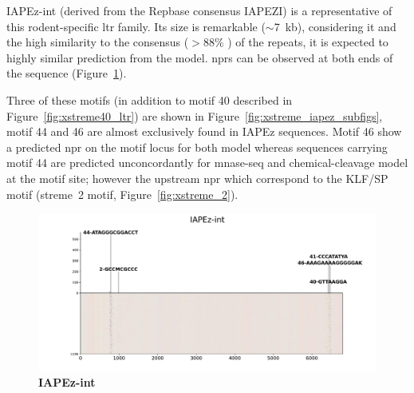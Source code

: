 \documentclass[11pt]{book}
\begin{document}
IAPEz-int (derived from the Repbase consensus IAPEZI) \cite{Repbase_IAPEZI} is a representative of this rodent-specific \gls{ltr} family. Its size is remarkable ($\sim$7~kb), considering it and the high similarity to the consensus ($>$88\% \cite{Repbase_IAPEZI}) of the repeats, it is expected to highly similar prediction from the model. \Glspl{npr} can be observed at both ends of the sequence (Figure~\ref{fig:iapez_int}). 

Three of these motifs (in addition to motif 40 described in Figure~\ref{fig:xstreme40_ltr}) are shown in Figure~\ref{fig:xstreme_iapez_subfigs}, motif 44 and 46 are almost exclusively found in IAPEz sequences. Motif 46 show a predicted \gls{npr} on the motif locus for both model whereas sequences carrying motif 44 are predicted unconcordantly for mnase-seq and chemical-cleavage model at the motif site; however the upstream \gls{npr} which correspond to the KLF/SP motif (streme~2 motif, Figure~\ref{fig:xstreme_2}).

\begin{figure}[htbp]
    \centering
    \includegraphics[trim=3cm 0cm 2.5cm 1.5cm, clip,width=\textwidth]{Figures/Results/xstreme_onrep_seq/IAPEz-int.pdf}
    \caption{\textbf{IAPEz-int}}
    \label{fig:iapez_int}
\end{figure}
\end{document}
